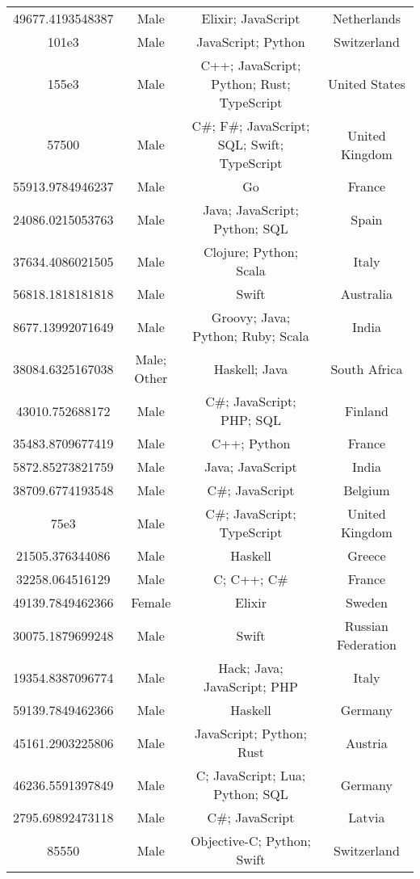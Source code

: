 \begin{center}
\begin{tabular}{ |c|c|c|c| }
49677.4193548387  &  Male  &  Elixir; JavaScript  &  Netherlands  \\ 
101e3  &  Male  &  JavaScript; Python  &  Switzerland  \\ 
155e3  &  Male  &  C++; JavaScript; Python; Rust; TypeScript  &  United States  \\ 
57500  &  Male  &  C\#; F\#; JavaScript; SQL; Swift; TypeScript  &  United Kingdom  \\ 
55913.9784946237  &  Male  &  Go  &  France  \\ 
24086.0215053763  &  Male  &  Java; JavaScript; Python; SQL  &  Spain  \\ 
37634.4086021505  &  Male  &  Clojure; Python; Scala  &  Italy  \\ 
56818.1818181818  &  Male  &  Swift  &  Australia  \\ 
8677.13992071649  &  Male  &  Groovy; Java; Python; Ruby; Scala  &  India  \\ 
38084.6325167038  &  Male; Other  &  Haskell; Java  &  South Africa  \\ 
43010.752688172  &  Male  &  C\#; JavaScript; PHP; SQL  &  Finland  \\ 
35483.8709677419  &  Male  &  C++; Python  &  France  \\ 
5872.85273821759  &  Male  &  Java; JavaScript  &  India  \\ 
38709.6774193548  &  Male  &  C\#; JavaScript  &  Belgium  \\ 
75e3  &  Male  &  C\#; JavaScript; TypeScript  &  United Kingdom  \\ 
21505.376344086  &  Male  &  Haskell  &  Greece  \\ 
32258.064516129  &  Male  &  C; C++; C\#  &  France  \\ 
49139.7849462366  &  Female  &  Elixir  &  Sweden  \\ 
30075.1879699248  &  Male  &  Swift  &  Russian Federation  \\ 
19354.8387096774  &  Male  &  Hack; Java; JavaScript; PHP  &  Italy  \\ 
59139.7849462366  &  Male  &  Haskell  &  Germany  \\ 
45161.2903225806  &  Male  &  JavaScript; Python; Rust  &  Austria  \\ 
46236.5591397849  &  Male  &  C; JavaScript; Lua; Python; SQL  &  Germany  \\ 
2795.69892473118  &  Male  &  C\#; JavaScript  &  Latvia  \\ 
85550  &  Male  &  Objective-C; Python; Swift  &  Switzerland  \\ 

\end{tabular}
\end{center}
